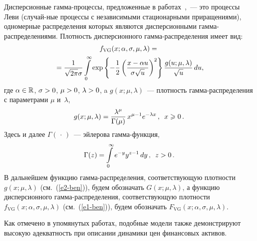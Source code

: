 \begin{multicols}{2}
Дисперсионные гамма-про\-цес\-сы, предложенные в работах~\cite{MadanSeneta1990, CarrMadanChang1998},~--- 
это процессы Леви
(слу\-чай-\linebreak ные процессы с независимыми стационарными приращениями),
одномерные распределения которых являются дисперсионными
гам\-ма-рас\-пре\-де\-ле\-ни\-ями. Плот\-ность дисперсионного гам\-ма-рас\-пре\-де\-ле\-ния
имеет вид:
\begin{multline}
f_{\mathrm{VG}}(x;\alpha,\sigma,\mu,\lambda)={}\\
\hspace*{-2mm}{}=\fr{1}{\sqrt{2\pi}\sigma}
\int\limits_{0}^{\infty}\exp\left\{-\fr{1}{2}\left(\fr{x-\alpha
u}{\sigma\sqrt{u}}\right)^2\right\}\fr{g(u;\mu,\lambda)}{\sqrt{u}}\,du,\!\!\!
\label{e1-ben}
\end{multline}
где $\alpha\in\mathbb{R}$, $\sigma\hm>0$, $\mu\hm>0$, $\lambda\hm>0$, a
$g(x;\mu,\lambda)$~--- плот\-ность гам\-ма-рас\-пре\-де\-ле\-ния с параметрами
$\mu$ и~$\lambda$,
\begin{equation}
g(x;\mu,\lambda)=\displaystyle\frac{\displaystyle \lambda^{\mu}\mathstrut}{\displaystyle \Gamma(\mu)\mathstrut}\,x^{\mu-1}e^{-\lambda
x}\,,\enskip x\geqslant0\,.\label{e2-ben}
\end{equation}
Здесь и далее $\Gamma(\,\cdot\,)$~--- эйлерова гам\-ма-функ\-ция,
$$
\Gamma(z) = \int\limits_{0}^{\infty}e^{-y}y^{z-1}\,dy\,,\enskip z>0\,.
$$
В дальнейшем функцию гамма-распределения, соответствующую плот\-ности
$g(x;\mu,\lambda)$ (см.~(\ref{e2-ben})), будем обозначать $G(x;\mu,\lambda)$, а
функцию дисперсионного гам\-ма-рас\-пре\-де\-ле\-ния, соответствующую
плотности $f_{\mathrm{VG}}(x;\alpha,\sigma,\mu,\lambda)$ (см.~(\ref{e1-ben})), будем
обозначать $F_{\mathrm{VG}}(x;\alpha,\sigma,\mu,\lambda)$.

Как отмечено в упомянутых работах, подобные модели также
демонстрируют высокую адекватность при описании динамики цен
финансовых активов.


\end{multicols}
